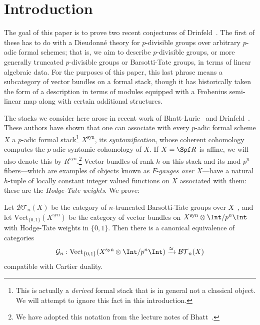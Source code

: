 \documentclass[10pt]{amsart}
\begin{document}
\tableofcontents

\section{Introduction}

The goal of this paper is to prove two recent conjectures of Drinfeld~\cite{drinfeld2023shimurian}. The first of these has to do with a Dieudonn\'e theory for $p$-divisible groups over arbitrary $p$-adic formal schemes; that is, we aim to describe $p$-divisible groups, or more generally truncated $p$-divisible groups or Barsotti-Tate groups, in terms of linear algebraic data. For the purposes of this paper, this last phrase means a subcategory of vector bundles on a formal stack, though it has historically taken the form of a description in terms of modules equipped with a Frobenius semi-linear map along with certain additional structures. 

The stacks we consider here arose in recent work of Bhatt-Lurie~\cites{bhatt2022absolute,bhatt2022prismatization,bhatt_lectures} and Drinfeld~\cite{drinfeld2022prismatization}. These authors have shown that one can associate with every $p$-adic formal scheme $X$ a $p$-adic formal stack\footnote{This is actually a \emph{derived} formal stack that is in general not a classical object. We will attempt to ignore this fact in this introduction.} $X^{\mathrm{syn}}$, its \emph{syntomification}, whose coherent cohomology computes the $p$-adic syntomic cohomology of $X$. If $X = \Spf R$ is affine, we will also denote this by $R^{\mathrm{syn}}$.\footnote{We have adopted this notation from the lecture notes of Bhatt~\cite{bhatt_lectures}.} Vector bundles of rank $h$ on this stack  and its mod-$p^n$ fibers---which are examples of objects known as $F$-\emph{gauges over $X$}---have a natural $h$-tuple of locally constant integer valued functions on $X$ associated with them: these are the \emph{Hodge-Tate weights}. We prove:

\begin{introthm}
\label{introthm:dieudonne}
Let $\mathcal{BT}_n(X)$ be the category of $n$-truncated Barsotti-Tate groups over $X$~\cite{MR0801922}, and let $\mathrm{Vect}_{\{0,1\}}(X^{\mathrm{syn}})$ be the category of vector bundles on $X^{\mathrm{syn}}\otimes\Int/p^n\Int$ with Hodge-Tate weights in $\{0,1\}$. Then there is a canonical equivalence of categories
\[
\mathcal{G}_n:\mathrm{Vect}_{\{0,1\}}(X^{\mathrm{syn}}\otimes\Int/p^n\Int)\xrightarrow{\simeq}\mathcal{BT}_n(X)
\]
compatible with Cartier duality.
\end{introthm}
\end{document}
